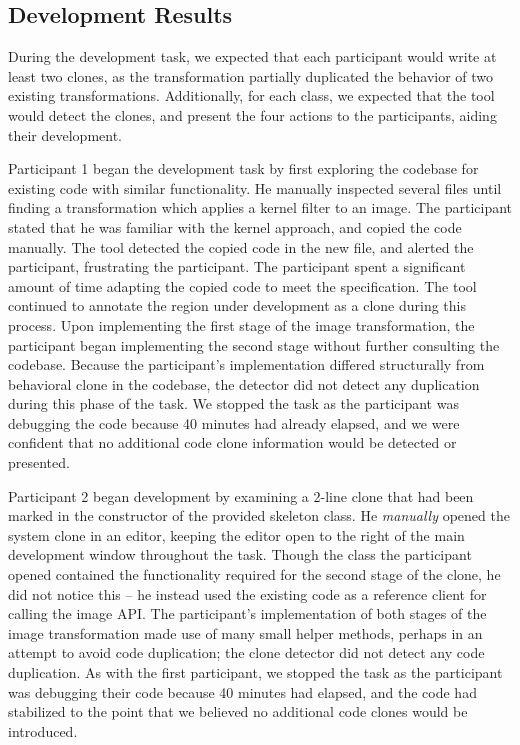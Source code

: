 \documentclass[nocopyrightspace,10pt]{sigplanconf}
\begin{document}
\subsection{Development Results}
During the development task, we expected that each participant would
write at least two clones, as the transformation partially duplicated
the behavior of two existing transformations. Additionally, for each class, we
expected that the tool would detect the clones, and present the four
actions to the participants, aiding their development.

Participant 1 began the development task by first exploring the
codebase for existing code with similar functionality. He manually
inspected several files until finding a transformation which applies a
kernel filter to an image. The participant stated that he was familiar
with the kernel approach, and copied the code manually. The tool
detected the copied code in the new file, and alerted the participant,
frustrating the participant. The participant spent a significant amount of time adapting
the copied code to meet the specification. The tool continued to annotate the region
under development as a clone during this process.
Upon implementing the first stage of the image
transformation, the participant began implementing the second stage
without further consulting the codebase. Because the participant's
implementation differed structurally from behavioral clone in the
codebase, the detector did not detect any duplication during this
phase of the task. We stopped the task as the participant was
debugging the code because 40 minutes had already elapsed, and we were
confident that no additional code clone information would be detected
or presented.

Participant 2 began development by examining a 2-line clone that had
been marked in the constructor of the provided skeleton class.  He
\textit{manually} opened the system clone in an editor, keeping the
editor open to the right of the main development window throughout the
task. Though the class the participant opened contained the
functionality required for the second stage of the clone, he did not
notice this -- he instead used the existing code as a reference client
for calling the image API. The participant's implementation of both
stages of the image transformation made use of many small helper
methods, perhaps in an attempt to avoid code duplication; the clone
detector did not detect any code duplication. As with the first
participant, we stopped the task as the participant was debugging
their code because 40 minutes had elapsed, and the code had stabilized
to the point that we believed no additional code clones would be
introduced.
\end{document}
